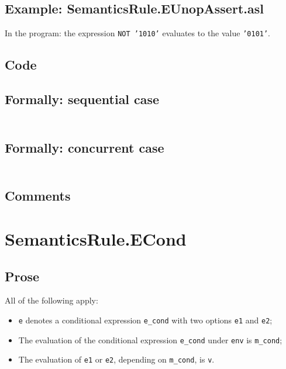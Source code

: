 \documentclass{book}
\begin{document}
  \subsection{Example: SemanticsRule.EUnopAssert.asl}
    In the program:
    the expression \texttt{NOT '1010'} evaluates to the value \texttt{'0101'}.

  \subsection{Code}

  \subsection{Formally: sequential case}
  \begin{align}
  \end{align} 

  \subsection{Formally: concurrent case}
  \begin{align}
  \end{align} 

  \subsection{Comments}

\section{SemanticsRule.ECond \label{sec:SemanticsRule.ECond}}

  \subsection{Prose}
  All of the following apply:
  \begin{itemize}
  \item \texttt{e} denotes a conditional expression \texttt{e\_cond} with two options \texttt{e1} and \texttt{e2};
  \item The evaluation of the conditional expression \texttt{e\_cond} under \texttt{env} is \texttt{m\_cond};
  \item The evaluation of \texttt{e1} or \texttt{e2}, depending on \texttt{m\_cond}, is \texttt{v}.
  \end{itemize}
\end{document}
